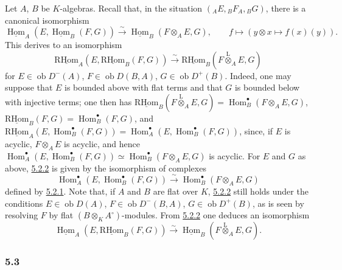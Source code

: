 \documentclass[11pt]{article}
\providecommand{\uHom}{\underline{\Hom}}
\providecommand{\uRHom}{\underline{\RHom}}
\DeclareMathOperator{\Hom}{Hom}
\newcommand{\ob}{\operatorname{ob}}
\providecommand{\RHom}{\mathrm{RHom}}
\providecommand{\lten}{\overset{\mathrm L}{\otimes}}
\providecommand{\RHom}{\mathrm{RHom}}
\providecommand{\Hom}{\operatorname{Hom}}
\providecommand{\ob}{\operatorname{ob}}
\providecommand{\lten}{\overset{\mathrm L}{\otimes}}
\providecommand{\RHom}{\mathrm R\mathcal{H}om}
\providecommand{\lten}{\overset{\mathrm L}{\otimes}}
\providecommand{\lten}{\overset{\mathrm L}{\otimes}}
\providecommand{\lten}{\overset{\mathrm L}{\otimes}}
\providecommand{\lten}{\overset{\mathrm L}{\otimes}}
\providecommand{\RHom}{\mathrm{RHom}}
\providecommand{\Hom}{\operatorname{Hom}}
\providecommand{\lten}{\overset{\mathrm L}{\otimes}}
\begin{document}
Let $A$, $B$ be $K$-algebras. Recall that, in the situation $({}_AE,{}_BF_A,{}_BG)$, there is a canonical isomorphism
\begin{equation}\tag{5.2.1}\label{sga5:IIIB:equation:5.2.1}
\uHom_A(E,\uHom_B(F,G))\xrightarrow{\sim}\uHom_B(F\otimes_AE,G),\qquad
f\longmapsto (y\otimes x\longmapsto f(x)(y)).
\end{equation}
This derives to an isomorphism
\begin{equation}\tag{5.2.2}\label{sga5:IIIB:equation:5.2.2}
\uRHom_A(E,\uRHom_B(F,G))\xrightarrow{\sim}\uRHom_B(F\lten_AE,G)
\end{equation}
for $E\in\ob D^-(A)$, $F\in\ob D(B,A)$, $G\in\ob D^+(B)$. Indeed, one may suppose that $E$ is bounded above with flat terms and that $G$ is bounded below with injective terms; one then has $\uRHom_B(F\lten_AE,G)=\Hom_B^\bullet(F\otimes_AE,G)$, $\uRHom_B(F,G)=\Hom_B^\bullet(F,G)$, and $\uRHom_A(E,\Hom_B^\bullet(F,G))=\Hom_A^\bullet(E,\Hom_B^\bullet(F,G))$, since, if $E$ is acyclic, $F\otimes_AE$ is acyclic, and hence $\Hom_A^\bullet(E,\Hom_B^\bullet(F,G))\simeq\Hom_B^\bullet(F\otimes_AE,G)$ is acyclic. For $E$ and $G$ as above, \hyperref[sga5:IIIB:equation:5.2.2]{5.2.2} is given by the isomorphism of complexes
\[
\Hom_A^\bullet(E,\Hom_B^\bullet(F,G))\xrightarrow{\sim}\Hom_B^\bullet(F\otimes_AE,G)
\]
defined by \hyperref[sga5:IIIB:equation:5.2.1]{5.2.1}. Note that, if $A$ and $B$ are flat over $K$, \hyperref[sga5:IIIB:equation:5.2.2]{5.2.2} still holds under the conditions $E\in\ob D(A)$, $F\in\ob D^-(B,A)$, $G\in\ob D^+(B)$, as is seen by resolving $F$ by flat $(B\otimes_KA^\circ)$-modules. From \hyperref[sga5:IIIB:equation:5.2.2]{5.2.2} one deduces an isomorphism
\begin{equation}\tag{5.2.3}\label{sga5:IIIB:equation:5.2.3}
\uHom_A(E,\uRHom_B(F,G))\xrightarrow{\sim}\uHom_B(F\lten_AE,G).
\end{equation}

\subsubsection*{5.3}\label{sga5:IIIB:subsubsection:5.3}
\end{document}
